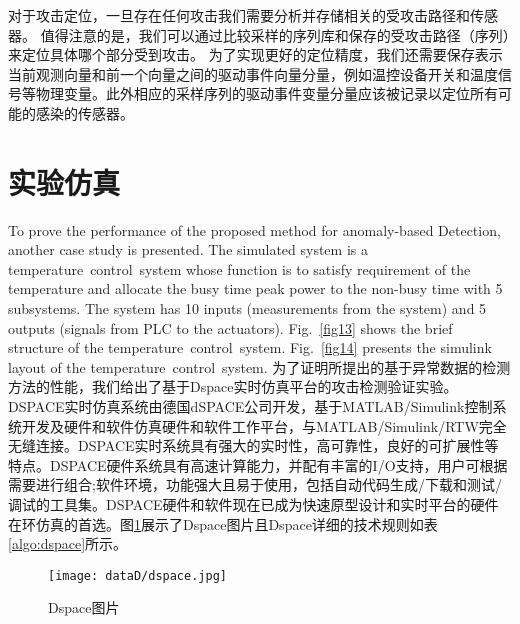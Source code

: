 对于攻击定位，一旦存在任何攻击我们需要分析并存储相关的受攻击路径和传感器。 值得注意的是，我们可以通过比较采样的序列库和保存的受攻击路径（序列）来定位具体哪个部分受到攻击。 为了实现更好的定位精度，我们还需要保存表示当前观测向量和前一个向量之间的驱动事件向量分量，例如温控设备开关和温度信号等物理变量。此外相应的采样序列的驱动事件变量分量应该被记录以定位所有可能的感染的传感器。

\section{实验仿真}
\label{sec:insertimage}

To prove the performance of the proposed method for anomaly-based Detection, another case study is presented. The simulated system is a temperature control system whose function is to satisfy requirement of the temperature and allocate the busy time peak power to the non-busy time with 5 subsystems. The system has 10 inputs (measurements from the system) and 5 outputs (signals from PLC to the actuators). Fig.~\ref{fig13} shows the brief structure of the temperature control system. Fig.~\ref{fig14} presents the simulink layout of the temperature control system.
为了证明所提出的基于异常数据的检测方法的性能，我们给出了基于Dspace实时仿真平台的攻击检测验证实验。DSPACE实时仿真系统由德国dSPACE公司开发，基于MATLAB/Simulink控制系统开发及硬件和软件仿真硬件和软件工作平台，与MATLAB/Simulink/RTW完全无缝连接。DSPACE实时系统具有强大的实时性，高可靠性，良好的可扩展性等特点。DSPACE硬件系统具有高速计算能力，并配有丰富的I/O支持，用户可根据需要进行组合;软件环境，功能强大且易于使用，包括自动代码生成/下载和测试/调试的工具集。DSPACE硬件和软件现在已成为快速原型设计和实时平台的硬件在环仿真的首选。图\ref{fig112}展示了Dspace图片且Dspace详细的技术规则如表\ref{algo:dspace}所示。

	\begin{figure}[!htb]
		\centering
		\texttt{[image: dataD/dspace.jpg]}
		\caption{Dspace图片}
		\label{fig112}
	\end{figure}

